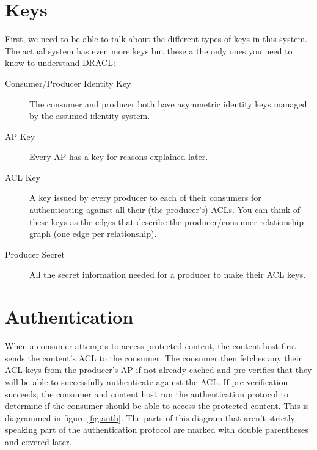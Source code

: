 \documentclass[pdftex,12pt,a4papaer,twoside,notitlepage]{report}
\begin{document}
\section{Keys}
\label{sec:keys}

First, we need to be able to talk about the different types of keys in this
system. The actual system has even more keys but these a the only ones you need
to know to understand DRACL:

\begin{description}
\item[Consumer/Producer Identity Key] The consumer and producer both have
  asymmetric identity keys managed by the assumed identity system.
\item[AP Key] Every AP has a key for reasons explained later.
\item[ACL Key] A key issued by every producer to each of their consumers for
  authenticating against all their (the producer's) ACLs. You can think of these
  keys as the edges that describe the producer/consumer relationship graph (one
  edge per relationship).
\item[Producer Secret] All the secret information needed for a producer to make
  their ACL keys.
\end{description}

\section{Authentication}
\label{sec:authentication}

When a consumer attempts to access protected content, the content host first
sends the content's ACL to the consumer. The consumer then fetches any their ACL
keys from the producer's AP if not already cached and pre-verifies that they
will be able to successfully authenticate against the ACL. If pre-verification
succeeds, the consumer and content host run the authentication protocol to
determine if the consumer should be able to access the protected content. This
is diagrammed in figure \cref{fig:auth}. The parts of this diagram that aren't
strictly speaking part of the authentication protocol are marked with double
parentheses and covered later.
\end{document}
